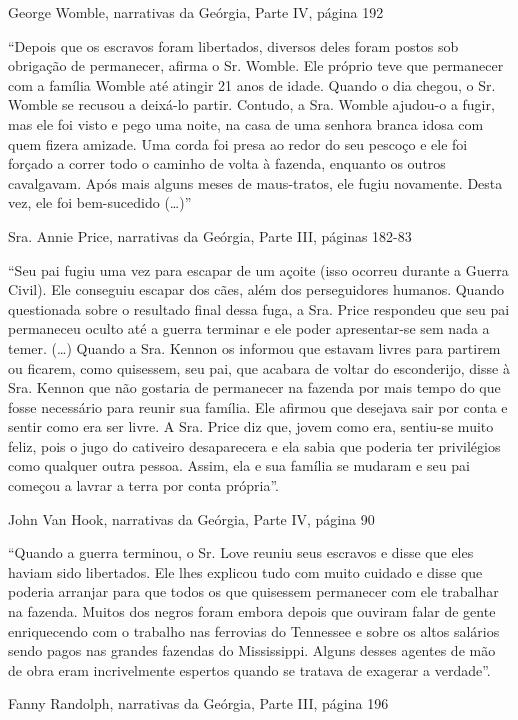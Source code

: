 George Womble, narrativas da Geórgia, Parte IV, página 192

``Depois que os escravos foram libertados, diversos deles foram postos
sob obrigação de permanecer, afirma o Sr. Womble. Ele próprio teve que
permanecer com a família Womble até atingir 21 anos de idade. Quando o
dia chegou, o Sr. Womble se recusou a deixá-lo partir. Contudo, a Sra.
Womble ajudou-o a fugir, mas ele foi visto e pego uma noite, na casa de
uma senhora branca idosa com quem fizera amizade. Uma corda foi presa ao
redor do seu pescoço e ele foi forçado a correr todo o caminho de volta
à fazenda, enquanto os outros cavalgavam. Após mais alguns meses de
maus-tratos, ele fugiu novamente. Desta vez, ele foi bem-sucedido
(\ldots{})''

Sra. Annie Price, narrativas da Geórgia, Parte III, páginas 182-83

``Seu pai fugiu uma vez para escapar de um açoite (isso ocorreu durante
a Guerra Civil). Ele conseguiu escapar dos cães, além dos perseguidores
humanos. Quando questionada sobre o resultado final dessa fuga, a Sra.
Price respondeu que seu pai permaneceu oculto até a guerra terminar e
ele poder apresentar-se sem nada a temer. (\ldots{}) Quando a Sra.
Kennon os informou que estavam livres para partirem ou ficarem, como
quisessem, seu pai, que acabara de voltar do esconderijo, disse à Sra.
Kennon que não gostaria de permanecer na fazenda por mais tempo do que
fosse necessário para reunir sua família. Ele afirmou que desejava sair
por conta e sentir como era ser livre. A Sra. Price diz que, jovem como
era, sentiu-se muito feliz, pois o jugo do cativeiro desaparecera e ela
sabia que poderia ter privilégios como qualquer outra pessoa. Assim, ela
e sua família se mudaram e seu pai começou a lavrar a terra por conta
própria''.

John Van Hook, narrativas da Geórgia, Parte IV, página 90

``Quando a guerra terminou, o Sr. Love reuniu seus escravos e disse que
eles haviam sido libertados. Ele lhes explicou tudo com muito cuidado e
disse que poderia arranjar para que todos os que quisessem permanecer
com ele trabalhar na fazenda. Muitos dos negros foram embora depois que
ouviram falar de gente enriquecendo com o trabalho nas ferrovias do
Tennessee e sobre os altos salários sendo pagos nas grandes fazendas do
Mississippi. Alguns desses agentes de mão de obra eram incrivelmente
espertos quando se tratava de exagerar a verdade''.

Fanny Randolph, narrativas da Geórgia, Parte III, página 196

